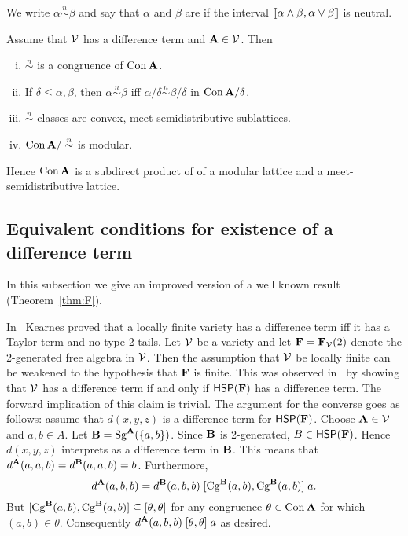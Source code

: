 \newcommand\neurel{\ensuremath{\stackrel{n}{\sim}}}
We write $\alpha \neurel \beta$ and say that $\alpha$ and $\beta$ are
 if the interval $\llbracket \alpha \wedge \beta, \alpha
\vee \beta\rrbracket$ is neutral. 

\begin{lem}
  \label{lem:mod-sd-meet}
Assume that $\mathcal{V}$ has a difference term and $\mathbf{A} \in \mathcal{V}$. Then
\begin{enumerate}[(i)]
\item $\neurel$ is a congruence of $\operatorname{Con}\mathbf{A}$.
\item If $\delta \leq \alpha, \beta$, then $\alpha \neurel \beta$
  iff $\alpha/\delta \neurel \beta/\delta$ in $\operatorname{Con}\mathbf{A}/\delta$.
\item $\neurel$-classes are convex, meet-semidistributive sublattices.
\item $\Con\bA/\neurel$ is modular.
\end{enumerate}
Hence $\operatorname{Con}\mathbf{A}$ is a subdirect product of of a modular lattice and a
meet-semidistributive lattice.
\end{lem}

\subsection{Equivalent conditions for existence of a difference term}
In this subsection we give an improved version of a well known result
(Theorem~\ref{thm:F}).

In~\cite{MR1358491} Kearnes proved that
a locally finite variety has a difference term
iff it has a Taylor term and no type-2 tails.
Let $\mathcal{V}$ be a variety and let $\mathbf{F} = \mathbf{F}_{\mathcal{V}}(2)$ denote the 2-generated
free algebra in $\mathcal{V}$.
Then the assumption that $\mathcal{V}$ be locally finite can be weakened
to the hypothesis that $\mathbf{F}$ is finite. This was observed in~\cite{MR1358491} 
by showing that $\mathcal{V}$ has a difference term if and only if $\mathsf{H} \mathsf{S} \mathsf{P}(\mathbf{F})$
has a difference term.
The forward implication of this claim is trivial. 
The argument for the converse goes as follows:
assume that $d(x, y, z)$ is a difference term for $\mathsf{H} \mathsf{S} \mathsf{P}(\mathbf{F})$.
Choose $\mathbf{A} \in \mathcal{V}$ and $a, b \in A$. Let $\mathbf{B} = \operatorname{Sg}^{\mathbf{A}} (\{a, b\})$.
Since $\mathbf{B}$ is 2-generated, $B \in \mathsf{H} \mathsf{S} \mathsf{P} (\mathbf{F})$.
Hence $d(x, y, z)$ interprets as a difference term in $\mathbf{B}$. This means that
$d^{\mathbf{A}} (a, a, b) = d^{\mathbf{B}} (a, a, b) = b$.
Furthermore,
\[
d^{\mathbf{A}} (a, b, b) = d^{\mathbf{B}} (a, b, b) \mathrel{[\operatorname{Cg}^{\mathbf{B}} (a, b), \operatorname{Cg}^{\mathbf{B}} (a, b)]} a.
\]
But $[\operatorname{Cg}^{\mathbf{B}} (a, b), \operatorname{Cg}^{\mathbf{B}} (a,b)]\subseteq [\theta, \theta]$ for any congruence
$\theta \in \operatorname{Con} \mathbf{A}$ for which $(a, b) \in \theta$. Consequently
$d^{\mathbf{A}} (a, b, b) \mathrel{[\theta, \theta]} a$ as desired.


